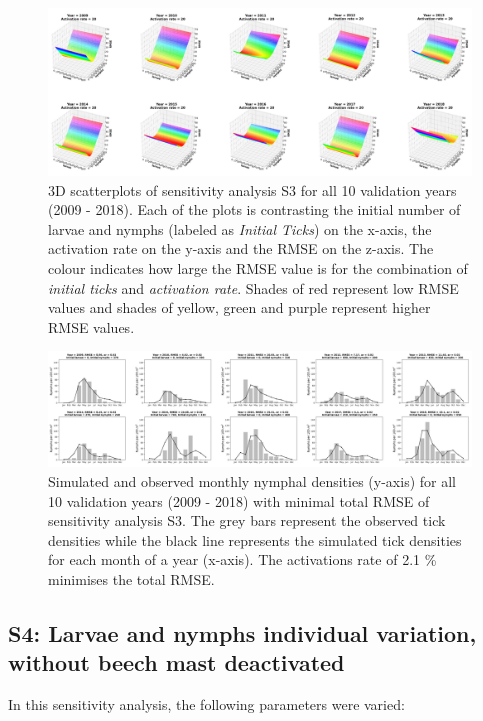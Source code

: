 \documentclass[a4paper, 11pt]{scrartcl}
\begin{document}
\begin{figure}[h!]
\centering
\includegraphics[width=1.0\textwidth]{figures/independent_initial_ticks_with_beech_error}
\caption{3D scatterplots of sensitivity analysis S3 for all 10 validation years (2009 - 2018). Each of the plots is contrasting the initial number of larvae and nymphs
(labeled as \textit{Initial Ticks}) on the x-axis, the activation rate on the y-axis and the RMSE on the z-axis. The colour indicates how large the RMSE value is for the
combination of \textit{initial ticks} and \textit{activation rate}. Shades of red represent low RMSE values and shades of yellow, green and purple represent higher RMSE values.}
\label{fig:independent_initial_ticks_with_beech_error}
\end{figure}

\begin{figure}[h!]
\centering
\includegraphics[width=1.0\textwidth]{figures/independent_initial_ticks_with_beech}
\caption{Simulated and observed monthly nymphal densities (y-axis) for all 10 validation years (2009 - 2018) with minimal total RMSE of sensitivity analysis S3. The grey bars
represent the observed tick densities while the black line represents the simulated tick densities for each month of a year (x-axis). The activations rate of 2.1 \% minimises
the total RMSE.}
\label{fig:independent_initial_ticks_with_beech}
\end{figure}



\newpage
\subsection{S4: Larvae and nymphs individual variation, without beech mast deactivated}
In this sensitivity analysis, the following parameters were varied:
\end{document}
